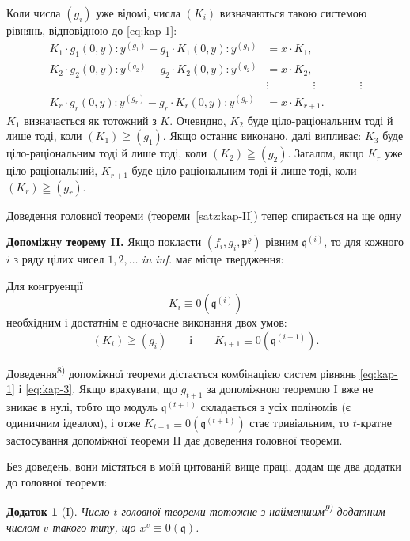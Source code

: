 \documentclass[11pt]{article}
\theoremstyle{plain}
\newtheorem{zusatz}{Додаток}
\begin{document}
Коли числа $(g_{i})$ уже відомі, числа $(K_{i})$ визначаються такою
системою рівнянь, відповідною до \eqref{eq:kap-1}:
\begin{equation}\label{eq:kap-3}
\begin{aligned}
K_1\cdot g_1(0,y):y^{(g_1)} - g_1\cdot K_1(0,y):y^{(g_1)} &= x\cdot K_1,\\
K_2\cdot g_2(0,y):y^{(g_2)} - g_2\cdot K_2(0,y):y^{(g_2)} &= x\cdot K_2,\\
&\vdots \qquad\qquad\vdots\qquad\qquad\vdots\\
K_{r} \cdot g_{r}(0,y):y^{(g_{r})} - g_{r} \cdot K_{r}(0,y):y^{(g_{r})} &= x \cdot K_{r+1}.
\end{aligned}
\end{equation}
$K_{1}$ визначається як тотожний з $K$. Очевидно, $K_{2}$ буде
ціло-раціональним тоді й лише тоді, коли $(K_1)\geqq(g_1)$.
Якщо останнє виконано, далі випливає: $K_{3}$ буде
ціло-раціональним тоді й лише тоді, коли $(K_2)\geqq(g_2)$.
Загалом, якщо $K_{r}$ уже ціло-раціональний, $K_{r+1}$ буде
ціло-раціональним тоді й лише тоді, коли $(K_r)\geqq(g_r)$.

Доведення головної теореми (теореми~\ref{satz:kap-II}) тепер
спирається на ще одну

\smallskip
\textbf{Допоміжну теорему II.} Якщо покласти
$(f_i,g_i,\mathfrak{p}^\varrho)$ рівним $\mathfrak{q}^{(i)}$, то для
кожного $i$ з ряду цілих чисел $1, 2, \ldots$ \textit{in inf.} має
місце твердження:

Для конгруенції
\[
K_{i} \equiv 0(\mathfrak{q}^{(i)})
\]
необхідним і достатнім є одночасне виконання двох умов:
\[
(K_{i}) \geqq (g_{i}) \qquad \text{і} \qquad
K_{i+1} \equiv 0(\mathfrak{q}^{(i+1)}).
\]

Доведення\textsuperscript{8)} допоміжної теореми дістається
комбінацією систем рівнянь \eqref{eq:kap-1} і \eqref{eq:kap-3}. Якщо
врахувати, що $g_{t+1}$ за допоміжною теоремою I вже не зникає в
нулі, тобто що модуль $\mathfrak{q}^{(t+1)}$ складається з усіх
поліномів (є одиничним ідеалом), і отже
$K_{t+1} \equiv 0(\mathfrak{q}^{(t+1)})$ стає тривіальним, то
$t$-кратне застосування допоміжної теореми II дає доведення
головної теореми.

\smallskip
Без доведень, вони містяться в моїй цитованій вище праці, додам ще
два додатки до головної теореми:

\begin{zusatz}[I]
Число $t$ головної теореми тотожне з найменшим\textsuperscript{9)}
додатним числом $v$ такого типу, що $x^{v} \equiv 0(\mathfrak{q})$.
\end{zusatz}
\end{document}
